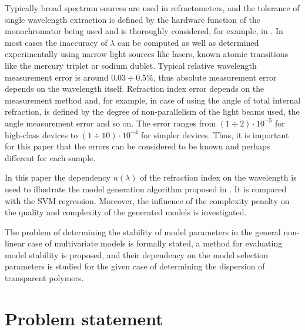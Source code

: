 \documentclass[11pt,a4paper]{article}
\theoremstyle{definition}
\begin{document}
Typically broad spectrum sources are used in refractometers, and the
tolerance of single wavelength extraction is defined by the hardware function
of the monochromator being used and is thoroughly considered, for example, in
\cite{Malishev79,Zaidel72}. In most cases the inaccuracy of $\lambda$ can be
computed as well as determined experimentally using narrow light sources like
lasers, known atomic transitions like the mercury triplet or sodium dublet.
Typical relative wavelength measurement error is around $0.03 \div 0.5\%$,
thus absolute measurement error depends on the wavelength itself. Refraction
index error depends on the measurement method and, for example,
in case of using the angle of total internal refraction, is defined by the degree
of non-parallelism of the light beams used, the angle measurement error
and so on. The error ranges from $(1 \div 2) \cdot 10^{-5}$ for high-class
devices to $(1 \div 10) \cdot 10^{-4}$ for simpler devices. Thus, it is important
for this paper that the errors can be considered to be known and perhaps
different for each sample.

In this paper the dependency $n(\lambda)$ of the refraction index on the wavelength is used
to illustrate the model generation algorithm proposed in \cite{Rudoy13}.
It is compared with the SVM regression. Moreover, the influence of the
complexity penalty on the quality and complexity of the generated models
is investigated.

The problem of determining the stability of model parameters
in the general non-linear case of multivariate models is formally stated, a method for evaluating
model stability is proposed, and their dependency on the model selection
parameters is studied for the given case of determining the dispersion
of transparent polymers.

\section{Problem statement}
\label{sect:prob_stat}
\end{document}
